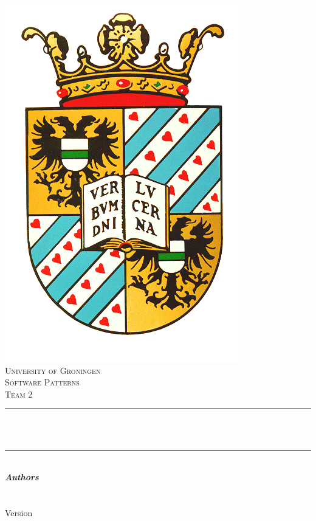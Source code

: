 

\begin{titlepage}
	\centering
    
    \vspace*{0.5 cm}
    \includegraphics[scale = 0.25]{images/rug.png}\\[1.0 cm]	%
    \textsc{\LARGE University of Groningen}\\[0.3cm]
	\textsc{\large {Software Patterns}}\\
	\textsc{\large {Team 2}} \\[2.0 cm]
	\rule{\linewidth}{0.2 mm} \\[0.4 cm]
	{ \huge \bfseries \thetitle}\\
	
	\rule{\linewidth}{0.2 mm} \\[1.5 cm]
			\textbf{\large\emph\textbf{Authors}}\\
			\theauthor
	~\\[2 cm]	
	{\large \thedate}\\[0.25cm]
		Version \VersionNumber \\
		\renewcommand{\headrulewidth}{0pt}
	\vfill

	
\end{titlepage}